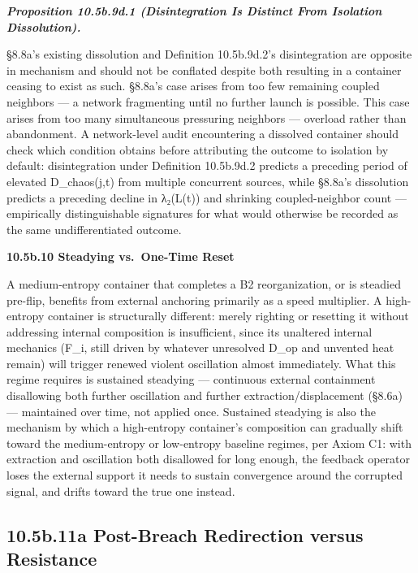 \documentclass[
]{article}
\begin{document}
\emph{\textbf{Proposition 10.5b.9d.1 (Disintegration Is Distinct From
Isolation Dissolution).}}

§8.8a's existing dissolution and Definition 10.5b.9d.2's disintegration
are opposite in mechanism and should not be conflated despite both
resulting in a container ceasing to exist as such. §8.8a's case arises
from too few remaining coupled neighbors --- a network fragmenting until
no further launch is possible. This case arises from too many
simultaneous pressuring neighbors --- overload rather than abandonment.
A network-level audit encountering a dissolved container should check
which condition obtains before attributing the outcome to isolation by
default: disintegration under Definition 10.5b.9d.2 predicts a preceding
period of elevated D\_chaos(j,t) from multiple concurrent sources, while
§8.8a's dissolution predicts a preceding decline in λ₂(L(t)) and
shrinking coupled-neighbor count --- empirically distinguishable
signatures for what would otherwise be recorded as the same
undifferentiated outcome.

\textbf{10.5b.10 Steadying vs.~One-Time Reset}

A medium-entropy container that completes a B2 reorganization, or is
steadied pre-flip, benefits from external anchoring primarily as a speed
multiplier. A high-entropy container is structurally different: merely
righting or resetting it without addressing internal composition is
insufficient, since its unaltered internal mechanics (F\_i, still driven
by whatever unresolved D\_op and unvented heat remain) will trigger
renewed violent oscillation almost immediately. What this regime
requires is sustained steadying --- continuous external containment
disallowing both further oscillation and further extraction/displacement
(§8.6a) --- maintained over time, not applied once. Sustained steadying
is also the mechanism by which a high-entropy container's composition
can gradually shift toward the medium-entropy or low-entropy baseline
regimes, per Axiom C1: with extraction and oscillation both disallowed
for long enough, the feedback operator loses the external support it
needs to sustain convergence around the corrupted signal, and drifts
toward the true one instead.

\hypertarget{b.11a-post-breach-redirection-versus-resistance}{%
\subsection{10.5b.11a Post-Breach Redirection versus
Resistance}\label{b.11a-post-breach-redirection-versus-resistance}}
\end{document}
